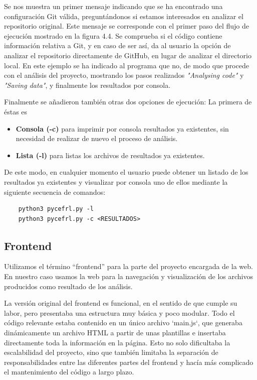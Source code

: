 \documentclass[a4paper, 12pt]{book}
\begin{document}
Se nos muestra un primer mensaje indicando que se ha encontrado una configuración Git válida, preguntándonos si estamos interesados en analizar el repositorio original. Este mensaje se corresponde con el primer paso del flujo de ejecución mostrado en la figura 4.4. Se comprueba si el código contiene información relativa a Git, y en caso de ser así, da al usuario la opción de analizar el repositorio directamente de GitHub, en lugar de analizar el directorio local. En este ejemplo se ha indicado al programa que no, de modo que procede con el análisis del proyecto, mostrando los pasos realizados \textit{"Analysing code"} y \textit{"Saving data"}, y finalmente los resultados por consola.

Finalmente se añadieron también otras dos opciones de ejecución: La primera de éstas es 

\begin{itemize}
    \item \textbf{Consola (-c)} para imprimir por consola resultados ya existentes, sin necesidad de realizar de nuevo el proceso de análisis.
    \item \textbf{Lista (-l)} para listas los archivos de resultados ya existentes.
\end{itemize}

De este modo, en cualquier momento el usuario puede obtener un listado de los resultados ya existentes y visualizar por consola uno de ellos mediante la siguiente secuencia de comandos:

\begin{verbatim}
    python3 pycefrl.py -l
    python3 pycefrl.py -c <RESULTADOS>
\end{verbatim}

\subsection{Frontend}

Utilizamos el término ``frontend'' para la parte del proyecto encargada de la web. En nuestro caso usamos la web para la navegación y visualización de los archivos producidos como resultado de los análisis.

La versión original del frontend es funcional, en el sentido de que cumple su labor, pero presentaba una estructura muy básica y poco modular. Todo el código relevante estaba contenido en un único archivo `main.js`, que generaba dinámicamente un archivo HTML a partir de unas plantillas e insertaba directamente toda la información en la página. Esto no solo dificultaba la escalabilidad del proyecto, sino que también limitaba la separación de responsabilidades entre las diferentes partes del frontend y hacía más complicado el mantenimiento del código a largo plazo.
\end{document}
